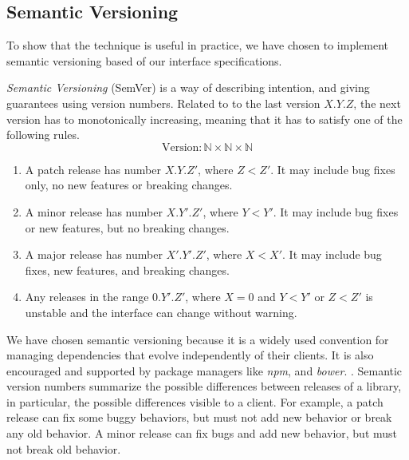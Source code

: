 \subsection{Semantic Versioning} \label{sec:semver}

To show that the technique is useful in practice, we have chosen to implement
semantic versioning based of our interface specifications.

\begin{definition}\textit{Semantic Versioning} (SemVer) is a way of describing
intention, and giving guarantees using version numbers\cite{semver}.
Related to to the last version $X.Y.Z$, the next version has to
monotonically increasing, meaning that it has to satisfy one of the
following rules.
$$ \text{Version} : \mathbb{N} \times \mathbb{N} \times \mathbb{N} $$

\begin{enumerate}
    \item A patch release has number $X.Y.Z'$, where $Z < Z'$. It may include
    bug fixes only, no new features or breaking changes.
    
    \item A minor release has number $X.Y'.Z'$, where $Y < Y'$. It may include
    bug fixes or new features, but no breaking changes.
    
    \item A major release has number $X'.Y'.Z'$, where $X < X'$. It may include
    bug fixes, new features, and breaking changes.
    
    \item Any releases in the range $0.Y'.Z'$, where $X = 0$ and $Y < Y'$ or $Z
    < Z'$ is unstable and the interface can change without warning.
\end{enumerate}

\end{definition}

We have chosen semantic versioning because it is a widely used
convention for managing dependencies that evolve independently of
their clients.
%
It is also encouraged and supported by package managers like
\emph{npm}, and \emph{bower}.
%
.
%
Semantic version numbers summarize the possible differences between
releases of a library, in particular, the possible differences visible
to a client. For example, a patch release can fix some buggy
behaviors, but must not add new behavior or break any old behavior. A
minor release can fix bugs and add new behavior, but must not break
old behavior.

